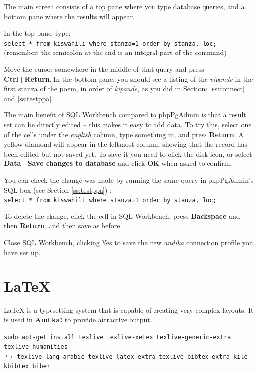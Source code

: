 The main screen consists of a top pane where you type database queries, and a bottom pane where the results will appear. 

In the top pane, type:\\
\verb|select * from kiswahili where stanza=1 order by stanza, loc;|\\
(remember: the semicolon at the end is an integral part of the command)

Move the cursor somewhere in the middle of that query and press \textbf{Ctrl+Return}.  In the bottom pane, you should see a listing of the \textit{vipande} in the first stanza of the poem, in order of \textit{kipande}, as you did in Sections \ref{ss:connect} and \ref{ss:testppa}.

The main benefit of SQL Workbench compared to phpPgAdmin is that a result set can be directly edited -- this makes it easy to add data.  To try this, select one of the cells under the \textit{english} column, type something in, and press \textbf{Return}.  A yellow diamond will appear in the leftmost column, showing that the record has been edited but not saved yet. To save it you need to click the disk icon, or select \textbf{Data \textrightarrow\ Save changes to database} and click \textbf{OK} when asked to confirm.

You can check the change was made by running the same query in phpPgAdmin's SQL box (see Section \ref{ss:testppa}) :\\
\verb|select * from kiswahili where stanza=1 order by stanza, loc;|

To delete the change, click the cell in SQL Workbench, press \textbf{Backspace} and then \textbf{Return}, and then save as before.

Close SQL Workbench, clicking Yes to save the new \textit{andika} connection profile you have set up.


\section{LaTeX}
\label{s:latex}

LaTeX is a typesetting system that is capable of creating very complex layouts.  It is used in \textbf{Andika!} to provide attractive output.

\verb|sudo apt-get install texlive texlive-xetex texlive-generic-extra texlive-humanities|\\
$\hookrightarrow$ \verb|texlive-lang-arabic texlive-latex-extra texlive-bibtex-extra kile kbibtex biber|

